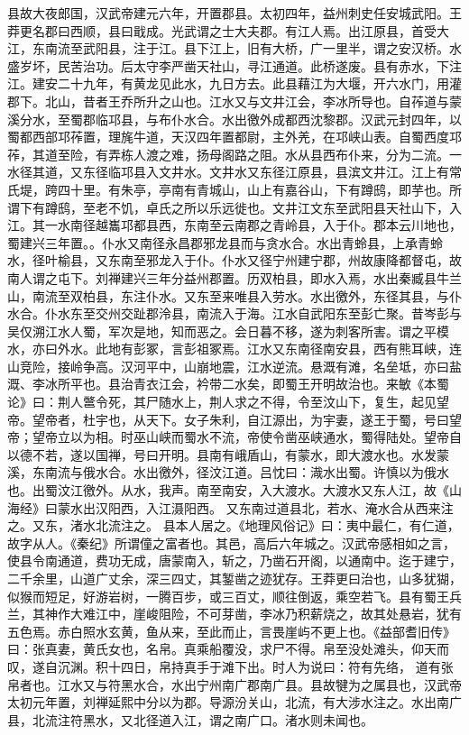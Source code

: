 \documentclass[12pt,UTF8]{ctexbook}
\begin{document}
县故大夜郎国，汉武帝建元六年，开置郡县。太初四年，益州刺史任安城武阳。王莽更名郡曰西顺，县曰戢成。光武谓之士大夫郡。有江人焉。出江原县，首受大江，东南流至武阳县，注于江。县下江上，旧有大桥，广一里半，谓之安汉桥。水盛岁坏，民苦治功。后太守李严凿天社山，寻江通道。此桥遂废。县有赤水，下注江。建安二十九年，有黄龙见此水，九日方去。此县藉江为大堰，开六水门，用灌郡下。北山，昔者王乔所升之山也。江水又与文井江会，李冰所导也。自莋道与蒙溪分水，至蜀郡临邛县，与布仆水合。水出徼外成都西沈黎郡。汉武元封四年，以蜀都西部邛莋置，理旄牛道，天汉四年置都尉，主外羌，在邛峡山表。自蜀西度邛莋，其道至险，有弄栋人渡之难，扬母阁路之阻。水从县西布仆来，分为二流。一水径其道，又东径临邛县入文井水。文井水又东径江原县，县滨文井江。江上有常氏堤，跨四十里。有朱亭，亭南有青城山，山上有嘉谷山，下有蹲鸱，即芋也。所谓下有蹲鸱，至老不饥，卓氏之所以乐远徙也。文井江文东至武阳县天社山下，入江。其一水南径越巂邛都县西，东南至云南郡之青岭县，入于仆。郡本云川地也，蜀建兴三年置。。仆水又南径永昌郡邪龙县而与贪水合。水出青蛉县，上承青蛉水，径叶榆县，又东南至邪龙入于仆。仆水又径宁州建宁郡，州故康降都督屯，故南人谓之屯下。刘禅建兴三年分益州郡置。历双柏县，即水入焉，水出秦臧县牛兰山，南流至双柏县，东注仆水。又东至来唯县入劳水。水出徼外，东径其县，与仆水合。仆水东至交州交趾郡泠县，南流入于海。江水自武阳东至彭亡聚。昔岑彭与吴仅溯江水人蜀，军次是地，知而恶之。会日暮不移，遂为刺客所害。谓之平模水，亦曰外水。此地有彭冢，言彭祖冢焉。江水又东南径南安县，西有熊耳峡，连山竞险，接岭争高。汉河平中，山崩地震，江水逆流。悬溉有滩，名垒坻，亦曰盐溉、李冰所平也。县治青衣江会，衿带二水矣，即蜀王开明故治也。来敏《本蜀论》曰：荆人鄨令死，其尸随水上，荆人求之不得，令至汶山下，复生，起见望帝。望帝者，杜宇也，从天下。女子朱利，自江源出，为宇妻，遂王于蜀，号曰望帝；望帝立以为相。时巫山峡而蜀水不流，帝使令凿巫峡通水，蜀得陆处。望帝自以德不若，遂以国禅，号曰开明。县南有峨盾山，有蒙水，即大渡水也。水发蒙溪，东南流与俄水合。水出徼外，径汶江道。吕忱曰：渽水出蜀。许慎以为俄水也。出蜀汶江徼外。从水，我声。南至南安，入大渡水。大渡水又东人江，故《山海经》曰蒙水出汉阳西，入江滠阳西。
又东南过道县北，若水、淹水合从西来注之。又东，渚水北流注之。
县本人居之。《地理风俗记》曰：夷中最仁，有仁道，故字从人。《秦纪》所谓僮之富者也。其邑，高后六年城之。汉武帝感相如之言，使县令南通道，费功无成，唐蒙南入，斩之，乃凿石开阁，以通南中。迄于建宁，二千余里，山道广丈余，深三四丈，其錾凿之迹犹存。王莽更曰治也，山多犹猢，似猴而短足，好游岩树，一腾百步，或三百丈，顺往倒返，乘空若飞。县有蜀王兵兰，其神作大难江中，崖峻阻险，不可芽凿，李冰乃积薪烧之，故其处悬岩，犹有五色焉。赤白照水玄黄，鱼从来，至此而止，言畏崖屿不更上也。《益部耆旧传》曰：张真妻，黄氏女也，名帛。真乘船覆没，求尸不得。帛至没处滩头，仰天而叹，遂自沉渊。积十四日，帛持真手于滩下出。时人为说曰：符有先络， 道有张帛者也。江水又与符黑水合，水出宁州南广郡南广县。县故犍为之属县也，汉武帝太初元年置，刘禅延熙中分以为郡。导源汾关山，北流，有大涉水注之。水出南广县，北流注符黑水，又北径道入江，谓之南广口。渚水则未闻也。
\end{document}
